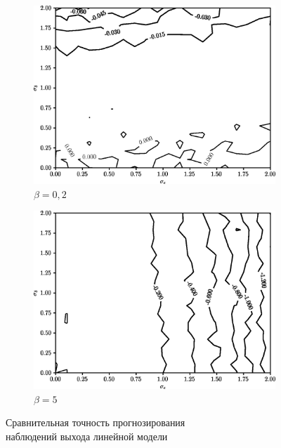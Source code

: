 \begin{figure}[h]
  \begin{subfigure}[b]{\linewidth}
    \centering
    \includegraphics[width=135mm]{fig/linear/predict/beta-0,2_predict-measured.png}
    \caption{\( \beta = 0{,}2 \)}
  \end{subfigure}

  \vspace{2\baselineskip}
  \begin{subfigure}[b]{\linewidth}
    \centering
    \includegraphics[width=135mm]{fig/linear/predict/beta-5_predict-measured.png}
    \caption{\( \beta = 5 \)}
  \end{subfigure}

  \vspace{\baselineskip}
  \caption{%
    Сравнительная точность прогнозирования \\
    наблюдений выхода линейной модели
  }\label{fig:comparison_linear_predict}
\end{figure}
